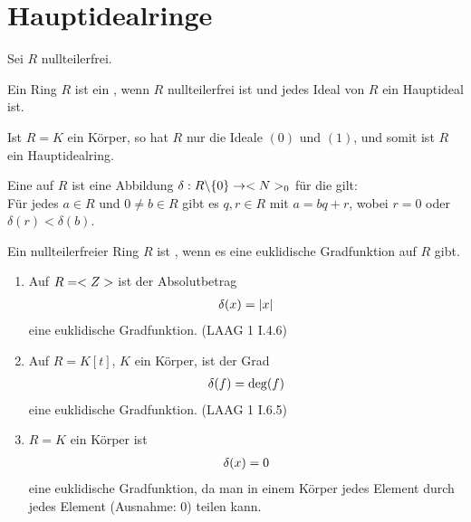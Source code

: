 \section{Hauptidealringe}

Sei $R$ nullteilerfrei.

\begin{definition}[Hauptidealring]
	Ein Ring $R$ ist ein , wenn $R$ nullteilerfrei ist und jedes Ideal von $R$ ein Hauptideal ist.
\end{definition}

\begin{example}
	Ist $R=K$ ein Körper, so hat $R$ nur die Ideale $(0)$ und $(1)$, und somit ist $R$ ein Hauptidealring.
\end{example}

\begin{definition}
	Eine  auf $R$ ist eine Abbildung $\delta:R\backslash \{0\}\to <N>_0$ für die gilt: \\
	Für jedes $a\in R$ und $0\neq b\in R$ gibt es $q,r\in R$ mit $a=bq+r$, wobei $r=0$ oder $\delta(r)<\delta(b)$.
	
	Ein nullteilerfreier Ring $R$ ist , wenn es eine euklidische Gradfunktion auf $R$ gibt.
\end{definition}

\begin{example}
	\begin{enumerate}
		\item Auf $R=<Z>$ ist der Absolutbetrag 
		\begin{align}
			\delta(x)=\vert x\vert\notag
		\end{align}
		eine euklidische Gradfunktion. (LAAG 1 I.4.6) %
		\item Auf $R=K[t]$, $K$ ein Körper, ist der Grad
		\begin{align}
			\delta(f) =\deg(f)\notag
		\end{align}
		eine euklidische Gradfunktion. (LAAG 1 I.6.5) %
		\item $R=K$ ein Körper ist 
		\begin{align}
			\delta(x)=0\notag
		\end{align}
		eine euklidische Gradfunktion, da man in einem Körper jedes Element durch jedes Element (Ausnahme: 0) teilen kann.
	\end{enumerate}
\end{example}

